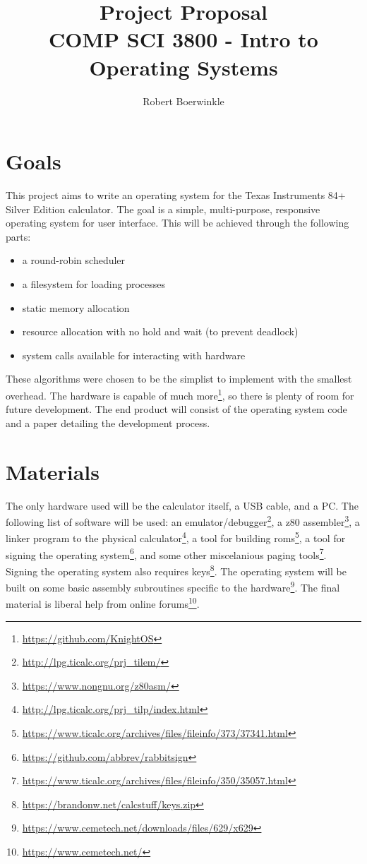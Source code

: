 \documentclass{article}
\title{Project Proposal \\ \normalsize COMP SCI 3800 - Intro to Operating Systems}
\author{Robert Boerwinkle}
\date{}
\begin{document}
\maketitle{}

\section*{Goals}

This project aims to write an operating system for the Texas Instruments 84+ Silver Edition calculator. The goal is a simple, multi-purpose, responsive operating system for user interface. This will be achieved through the following parts:

\begin{itemize}
  \item a round-robin scheduler
  \item a filesystem for loading processes
  \item static memory allocation
  \item resource allocation with no hold and wait (to prevent deadlock)
  \item system calls available for interacting with hardware
\end{itemize}

These algorithms were chosen to be the simplist to implement with the smallest overhead. The hardware is capable of much more\footnote{\url{https://github.com/KnightOS}}, so there is plenty of room for future development. The end product will consist of the operating system code and a paper detailing the development process.

\section*{Materials}

The only hardware used will be the calculator itself, a USB cable, and a PC. The following list of software will be used: an emulator/debugger\footnote{\url{http://lpg.ticalc.org/prj_tilem/}}, a z80 assembler\footnote{\url{https://www.nongnu.org/z80asm/}}, a linker program to the physical calculator\footnote{\url{http://lpg.ticalc.org/prj_tilp/index.html}}, a tool for building roms\footnote{\url{https://www.ticalc.org/archives/files/fileinfo/373/37341.html}}, a tool for signing the operating system\footnote{\url{https://github.com/abbrev/rabbitsign}}, and some other miscelanious paging tools\footnote{\url{https://www.ticalc.org/archives/files/fileinfo/350/35057.html}}. Signing the operating system also requires keys\footnote{\url{https://brandonw.net/calcstuff/keys.zip}}. The operating system will be built on some basic assembly subroutines specific to the hardware\footnote{\url{https://www.cemetech.net/downloads/files/629/x629}}. The final material is liberal help from online forums\footnote{\url{https://www.cemetech.net/}}.
\end{document}
